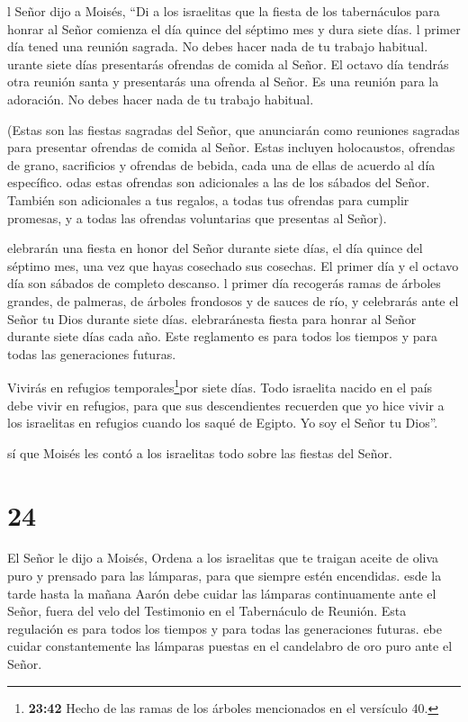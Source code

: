  l Señor dijo a Moisés,  ``Di a los israelitas
que la fiesta de los tabernáculos para honrar al Señor comienza el día
quince del séptimo mes y dura siete días.  l primer día
tened una reunión sagrada. No debes hacer nada de tu trabajo habitual.
 urante siete días presentarás ofrendas de comida al Señor.
El octavo día tendrás otra reunión santa y presentarás una ofrenda al
Señor. Es una reunión para la adoración. No debes hacer nada de tu
trabajo habitual.

 (Estas son las fiestas sagradas del Señor, que anunciarán
como reuniones sagradas para presentar ofrendas de comida al Señor.
Estas incluyen holocaustos, ofrendas de grano, sacrificios y ofrendas de
bebida, cada una de ellas de acuerdo al día específico. 
odas estas ofrendas son adicionales a las de los sábados del Señor.
También son adicionales a tus regalos, a todas tus ofrendas para cumplir
promesas, y a todas las ofrendas voluntarias que presentas al Señor).

 elebrarán una fiesta en honor del Señor durante siete
días, el día quince del séptimo mes, una vez que hayas cosechado sus
cosechas. El primer día y el octavo día son sábados de completo
descanso.  l primer día recogerás ramas de árboles grandes,
de palmeras, de árboles frondosos y de sauces de río, y celebrarás ante
el Señor tu Dios durante siete días.  elebraránesta fiesta
para honrar al Señor durante siete días cada año. Este reglamento es
para todos los tiempos y para todas las generaciones futuras.

 Vivirás en refugios temporales\footnote{\textbf{23:42}
  Hecho de las ramas de los árboles mencionados en el versículo 40.}por
siete días. Todo israelita nacido en el país debe vivir en refugios,
 para que sus descendientes recuerden que yo hice vivir a
los israelitas en refugios cuando los saqué de Egipto. Yo soy el Señor
tu Dios''.

 sí que Moisés les contó a los israelitas todo sobre las
fiestas del Señor.

\hypertarget{section-23}{%
\section{24}\label{section-23}}

 El Señor le dijo a Moisés,  Ordena a los
israelitas que te traigan aceite de oliva puro y prensado para las
lámparas, para que siempre estén encendidas.  esde la tarde
hasta la mañana Aarón debe cuidar las lámparas continuamente ante el
Señor, fuera del velo del Testimonio en el Tabernáculo de Reunión. Esta
regulación es para todos los tiempos y para todas las generaciones
futuras.  ebe cuidar constantemente las lámparas puestas en
el candelabro de oro puro ante el Señor.


